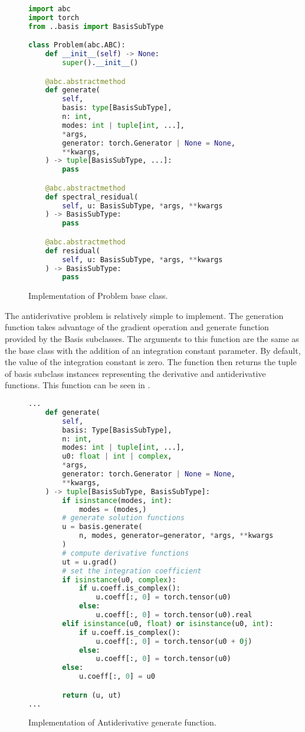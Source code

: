 \begin{figure}[H]
  \centering
  \begin{lstlisting}[language=Python]
import abc
import torch
from ..basis import BasisSubType

class Problem(abc.ABC):
    def __init__(self) -> None:
        super().__init__()

    @abc.abstractmethod
    def generate(
        self,
        basis: type[BasisSubType],
        n: int,
        modes: int | tuple[int, ...],
        *args,
        generator: torch.Generator | None = None,
        **kwargs,
    ) -> tuple[BasisSubType, ...]:
        pass

    @abc.abstractmethod
    def spectral_residual(
        self, u: BasisSubType, *args, **kwargs
    ) -> BasisSubType:
        pass

    @abc.abstractmethod
    def residual(
        self, u: BasisSubType, *args, **kwargs
    ) -> BasisSubType:
        pass
  \end{lstlisting}
  \caption{Implementation of Problem base class.}\label{fig:problem_impl}
\end{figure}

The antiderivative problem is relatively simple to implement. The generation function takes advantage of the gradient operation and generate function provided by the Basis subclasses. The arguments to this function are the same as the base class with the addition of an integration constant parameter. By default, the value of the integration constant is zero. The function then returns the tuple of basis subclass instances representing the derivative and antiderivative functions. This function can be seen in .

\begin{figure}[H]
  \centering
  \begin{lstlisting}[language=Python]
...
    def generate(
        self,
        basis: Type[BasisSubType],
        n: int,
        modes: int | tuple[int, ...],
        u0: float | int | complex,
        *args,
        generator: torch.Generator | None = None,
        **kwargs,
    ) -> tuple[BasisSubType, BasisSubType]:
        if isinstance(modes, int):
            modes = (modes,)
        # generate solution functions
        u = basis.generate(
            n, modes, generator=generator, *args, **kwargs
        )
        # compute derivative functions
        ut = u.grad()
        # set the integration coefficient
        if isinstance(u0, complex):
            if u.coeff.is_complex():
                u.coeff[:, 0] = torch.tensor(u0)
            else:
                u.coeff[:, 0] = torch.tensor(u0).real
        elif isinstance(u0, float) or isinstance(u0, int):
            if u.coeff.is_complex():
                u.coeff[:, 0] = torch.tensor(u0 + 0j)
            else:
                u.coeff[:, 0] = torch.tensor(u0)
        else:
            u.coeff[:, 0] = u0

        return (u, ut)
...
  \end{lstlisting}
  \caption{Implementation of Antiderivative generate function.}\label{fig:antiderivative_generate_impl}
\end{figure}

